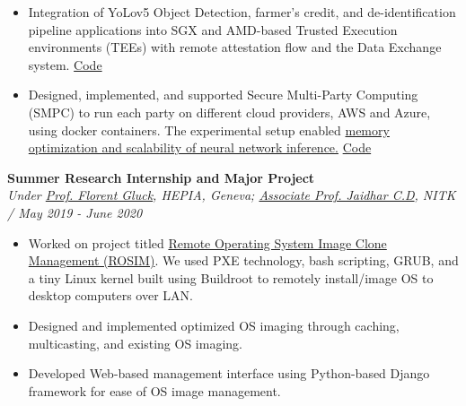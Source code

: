 \documentclass[a4paper,11pt]{article}
\begin{document}
\begin{itemize}
\item Integration of YoLov5 Object Detection, farmer's credit, and de-identification pipeline applications into SGX and AMD-based Trusted Execution environments (TEEs) with remote attestation flow and the Data Exchange system. \href{https://github.com/datakaveri/P3DX-SE-manager}{Code}
\item Designed, implemented, and supported Secure Multi-Party Computing (SMPC) to run each party on different cloud providers, AWS and Azure, using docker containers. The experimental setup enabled \href{https://ieeexplore.ieee.org/document/10427509/}{memory optimization and scalability of neural network inference.} \href{https://github.com/datakaveri/iudx-MOTION2NX}{Code}
\end{itemize}
\textbf {Summer Research Internship and Major Project} \\
\textit{Under \href{https://www.hesge.ch/hepia/annuaire/florent-gluck}{Prof. Florent Gluck}, HEPIA, Geneva; \href{https://infotech.nitk.ac.in/faculty/jaidhar-c-d}{Associate Prof. Jaidhar C.D}, NITK / May 2019 - June 2020}
\begin{itemize} 
     \item Worked on project titled \href{https://gitlab.com/remote-os-Image-clone-deployment}{Remote Operating System Image Clone Management (ROSIM)}. We used PXE technology, bash scripting,  GRUB, and a tiny Linux kernel built using Buildroot to remotely install/image OS to desktop computers over LAN. 
   \item Designed and implemented optimized OS imaging through caching, multicasting, and existing OS imaging.
	\item Developed Web-based management interface using Python-based Django framework for ease of OS image management.
\end{itemize}
\end{document}
